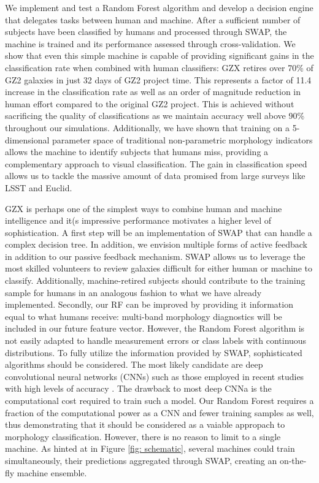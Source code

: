 We implement and test a Random Forest algorithm and develop a decision engine that delegates tasks between human and machine. After a sufficient number of subjects have been classified by humans and processed through SWAP, the machine is trained and its performance assessed through cross-validation. We show that even this simple machine is capable of providing significant gains in the classification rate when combined with human classifiers: GZX retires over 70\% of GZ2 galaxies in just 32 days of GZ2 project time. This represents a factor of 11.4 increase in the classification rate as well as an order of magnitude reduction in human effort compared to the original GZ2 project. This is achieved without sacrificing the quality of classifications as we maintain accuracy well above 90\% throughout our simulations. Additionally, we have shown that training on a 5-dimensional parameter space of traditional non-parametric morphology indicators allows the machine to identify subjects that humans miss, providing a complementary approach to visual classification. The gain in classification speed allows us to tackle the massive amount of data promised from large surveys like LSST and Euclid.


GZX is perhaps one of the simplest ways to combine human and machine intelligence and it(s impressive performance motivates a higher level of sophistication. A first step will be an implementation of SWAP that can handle a complex decision tree. In addition, we envision multiple forms of active feedback in addition to our passive feedback mechanism. SWAP allows us to leverage the most skilled volunteers to review galaxies difficult for either human or machine to classify. Additionally, machine-retired subjects should contribute to the training sample for humans in an analogous fashion to what we have already implemented. Secondly, our RF can be improved by providing it information equal to what humans receive: multi-band morphology diagnostics will be included in our future feature vector. However, the Random Forest algorithm is not easily adapted to handle measurement errors or class labels with continuous distributions. To fully utilize the information provided by SWAP, sophisticated algorithms should be considered. The most likely candidate are deep convolutional neural networks (CNNs) such as those employed in recent studies with high levels of accuracy \citep{DominguezSanchez2017,HuertasCompany2008}. The drawback to most deep CNNa is the computational cost required to train such a model. Our Random Forest requires a fraction of the computational power as a CNN and fewer training samples as well, thus demonstrating that it should be considered as a vaiable appropach to morphology classification.  However, there is no reason to limit to a single machine. As hinted at in Figure \ref{fig: schematic}, several machines could train simultaneously, their predictions aggregated through SWAP, creating an on-the-fly machine ensemble.



